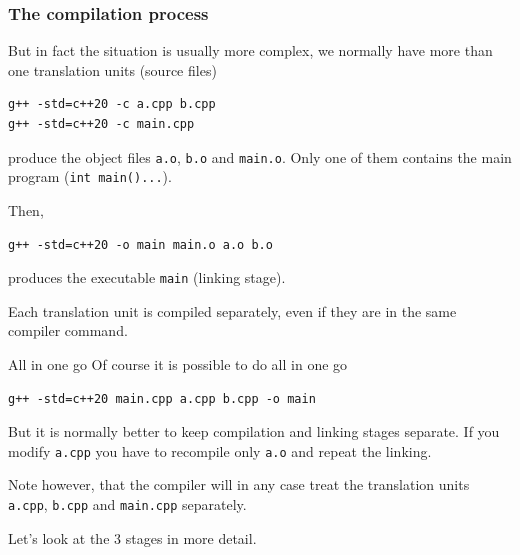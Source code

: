 \documentclass[12pt,aspectratio=169]{beamer}
\begin{document}
\begin{frame}[fragile]
  \frametitle{The compilation process}
  But in fact the situation  is usually more complex, \alert{we normally have more than one translation units (source files)}

\begin{verbatim}
g++ -std=c++20 -c a.cpp b.cpp 
g++ -std=c++20 -c main.cpp
\end{verbatim}

  produce the \alert{object files} \texttt{a.o}, \texttt{b.o} and
  \texttt{main.o}. Only one of them contains the \alert{main program}
  (\texttt{int main(){...}}).

  Then,
\begin{verbatim}
g++ -std=c++20 -o main main.o a.o b.o
\end{verbatim}
  produces the \alert{executable} \texttt{main} (linking stage).
  \smallskip
  
  Each translation unit \alert{is compiled separately, even if they are
    in the same compiler command}.
\end{frame}

\begin{frame}[fragile]{All in one go}
	Of course it is possible to do all in one go
\begin{verbatim}
g++ -std=c++20 main.cpp a.cpp b.cpp -o main
\end{verbatim}	
But it is normally better to keep compilation and linking stages separate. If you modify \texttt{a.cpp} you have
to recompile only \texttt{a.o} and repeat the linking.
\smallskip

Note however, that the compiler will in any case treat the translation units \texttt{a.cpp}, \texttt{b.cpp} and \texttt{main.cpp} separately.


\medskip

Let's look at the 3 stages in more detail.
	\end{frame}
 

 
\end{document}
